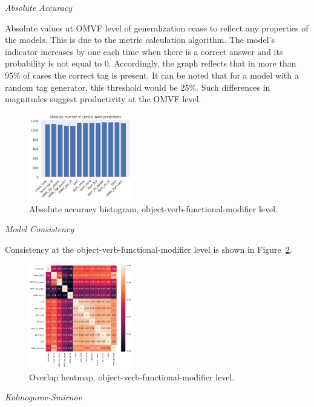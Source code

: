 \documentclass[a4paper]{article}
\newcommand{\head}[1]{\vspace{0.5em}\emph{#1}\vspace{0.25em}}
\begin{document}
\head{Absolute Accuracy}

Absolute values at OMVF level of generalization cease to reflect
any properties of the models. This is due to the metric calculation
algorithm. The model's indicator increases by one each time when there
is a correct answer and its probability is not equal to 0.
Accordingly, the graph reflects that in more than 95\% of cases the
correct tag is present. It can be noted that for a model with a random
tag generator, this threshold would be 25\%. Such differences in magnitudes suggest productivity at the OMVF level. 

\begin{figure}
\caption{Absolute accuracy histogram, object-verb-functional-modifier level.}
\label{fig:abs-accuracy-hist-ovfm}
\centering
\includegraphics[width=0.4\textwidth]{figures/pdf/abs-accuracy-hist-ovfm.pdf}
\end{figure}

\head{Model Consistency}

Consistency at the object-verb-functional-modifier level is shown in
Figure~\ref{fig:heatmap-context-accord-ovfm}.

\begin{figure}
\label{fig:heatmap-context-accord-ovfm}
\caption{Overlap heatmap, object-verb-functional-modifier level.}
\centering
\includegraphics[width=0.4\textwidth]{figures/pdf/heatmap-context-accord-ovfm.pdf}
\end{figure}

\head{Kolmogorov-Smirnov}%
\end{document}
